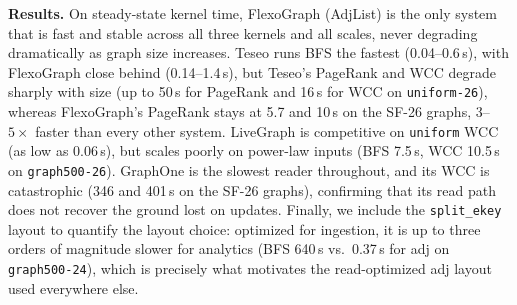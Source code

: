 

\textbf{Results.}
On steady-state kernel time, FlexoGraph (AdjList) is the only system that is fast and stable across all three kernels and all scales, never degrading dramatically as graph size increases.
Teseo runs BFS the fastest (0.04--0.6\,s), with FlexoGraph close behind (0.14--1.4\,s), but Teseo's PageRank and WCC degrade sharply with size (up to 50\,s for PageRank and 16\,s for WCC on \texttt{uniform-26}), whereas FlexoGraph's
PageRank stays at 5.7 and 10\,s on the SF-26 graphs, $3$--$5\times$ faster than
every other system. 
LiveGraph is competitive on \texttt{uniform} WCC (as low as 0.06\,s), but scales poorly on power-law inputs (BFS 7.5\,s, WCC 10.5\,s on \texttt{graph500-26}). 
GraphOne is the slowest reader throughout, and its WCC is catastrophic (346 and 401\,s on the SF-26 graphs), confirming that its read path does not recover the ground lost on updates.
Finally, we include the \texttt{split\_ekey} layout to quantify the layout choice: optimized for ingestion, it is up to three orders of magnitude slower for analytics (BFS 640\,s vs.\ 0.37\,s for adj on \texttt{graph500-24}), which is precisely what motivates the read-optimized adj layout used everywhere else.

